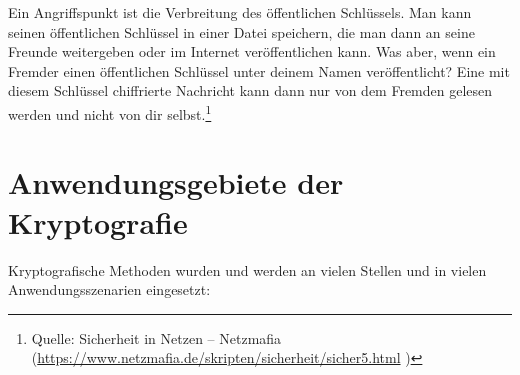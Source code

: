 Ein Angriffspunkt ist die Verbreitung des öffentlichen Schlüssels. Man kann
seinen öffentlichen Schlüssel in einer Datei speichern, die man dann an seine
Freunde weitergeben oder im Internet veröffentlichen kann. Was aber, wenn ein
Fremder einen öffentlichen Schlüssel unter deinem Namen veröffentlicht? Eine mit
diesem Schlüssel chiffrierte Nachricht kann dann nur von dem Fremden gelesen
werden und nicht von dir selbst.\footnote{Quelle: Sicherheit in Netzen --
Netzmafia (\url{https://www.netzmafia.de/skripten/sicherheit/sicher5.html} 
)}


\section{Anwendungsgebiete der Kryptografie}

Kryptografische Methoden wurden und werden an vielen Stellen und in vielen
Anwendungsszenarien eingesetzt:

